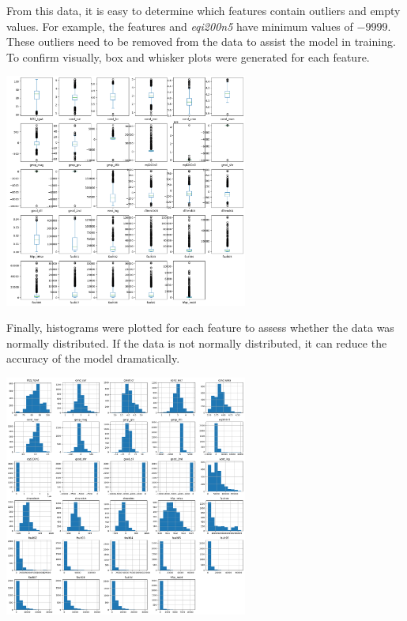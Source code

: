 \documentclass{article}[12pt]
\begin{document}
\indent
From this data, it is easy to determine which features contain outliers and empty values. For example, the features \emph{} and \emph{eqi200n5} have minimum values of $-9999$. These outliers need to be removed from the data to assist the model in training. To confirm visually, box and whisker plots were generated for each feature.\\

\begin{center}
    \includegraphics[width=0.6\textwidth]{box-whisker.png}
\end{center}

Finally, histograms were plotted for each feature to assess whether the data was normally distributed. If the data is not normally distributed, it can reduce the accuracy of the model dramatically.\\

\begin{center}
    \includegraphics[width=0.6\textwidth]{histogram.png}
\end{center}
\end{document}
